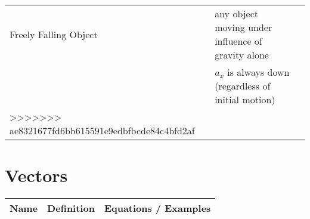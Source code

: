 \documentclass[11pt]{article}
\begin{document}
\begin{tabularx}{\textwidth}{l| X l}
    Freely Falling Object      & any object moving under influence of gravity alone \\* & $ a_{x} $ is always down (regardless of initial motion) \\ \hline
>>>>>>> ae8321677fd6bb615591e9edbfbcde84c4bfd2af
\end{tabularx}

\section{Vectors}
\begin{tabularx}{\textwidth}{l| X l}
    Name & Definition & Equations / Examples \\ \hline
\end{tabularx}
\end{document}
